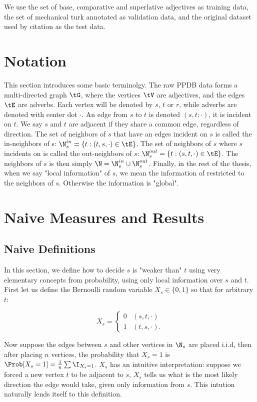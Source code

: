 We use the set of base, comparative and superlative adjectives as training data, the set of mechanical turk annotated as validation data, and the original dataset used by {citation} as the test data. 

\section{Notation}

This section introduces some basic terminolgy. The raw PPDB data forms a multi-directed graph $\tG$, where the vertices $\tV$ are adjectives, and the edges $\tE$ are adverbs. Each vertex will be denoted by $s$, $t$ or $r$, while adverbs are denoted with center dot $\cdot$. An edge from $s$ to $t$ is denoted $(s,t; \cdot)$, it is incident on $t$. We say $s$ and $t$ are adjacent if they share a common edge, regardless of direction. The set of neighbors of $s$ that have an edges incident on $s$ is called the in-neighbors of s: $\N^{in}_s = \{ t : (t,s, \cdot) \in \tE \}$. The set of neighbors of $s$ where $s$ incidents on is called the out-neighbors of $s$: $\N^{out}_s = \{ t : (s,t, \cdot) \in \tE \}$. The neighbors of $s$ is then simply $\N = \N^{in}_s \cup \N^{out}_s$. Finally, in the rest of the thesis, when we say "local information" of $s$, we mean the information of restricted to the neighbors of $s$. Otherwise the information is "global".

\section{Naive Measures and Results}

\subsection{Naive Definitions}

In this section, we define how to decide $s$ is "weaker than" $t$ using very elementary concepts from probability, using only local information over $s$ and $t$. First let us define the Bernoulli random variable $X_s \in \{0,1\}$ so that for arbitrary $t$:

\begin{equation}
X_{s} = \begin{cases} 
	0 & (s,t, \cdot) \\
	1  & (t,s, \cdot).
\end{cases}
\end{equation}

Now suppose the edges between $s$ and other vertices in $\N_s$ are placed i.i.d, then after placing $n$ vertices, the probability that $X_s = 1$ is $\Prob[X_s = 1] = \frac{1}{n} \sum \I_{X_s = 1}$. $X_s$ has an intuitive interpretation: suppose we forced a new vertex $t$ to be adjacent to $s$, $X_s$ tells us what is the most likely direction the edge would take, given only information from $s$. This intution naturally lends itself to this definition.


